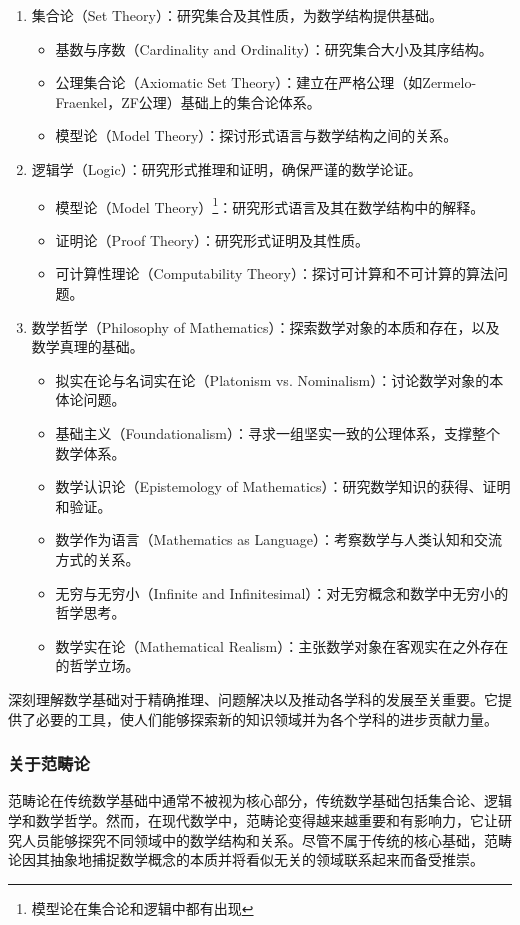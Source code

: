 \begin{enumerate}
  \item 集合论（Set Theory）：研究集合及其性质，为数学结构提供基础。
    \begin{itemize}
      \item 基数与序数（Cardinality and Ordinality）：研究集合大小及其序结构。
      \item 公理集合论（Axiomatic Set Theory）：建立在严格公理（如Zermelo-Fraenkel，ZF公理）基础上的集合论体系。
      \item 模型论（Model Theory）：探讨形式语言与数学结构之间的关系。
    \end{itemize}
    
  \item 逻辑学（Logic）：研究形式推理和证明，确保严谨的数学论证。
    \begin{itemize}
      \item 模型论（Model Theory）\footnote{模型论在集合论和逻辑中都有出现}：研究形式语言及其在数学结构中的解释。
      \item 证明论（Proof Theory）：研究形式证明及其性质。
      \item 可计算性理论（Computability Theory）：探讨可计算和不可计算的算法问题。
    \end{itemize}
    
  \item 数学哲学（Philosophy of Mathematics）：探索数学对象的本质和存在，以及数学真理的基础。
    \begin{itemize}
      \item 拟实在论与名词实在论（Platonism vs. Nominalism）：讨论数学对象的本体论问题。
      \item 基础主义（Foundationalism）：寻求一组坚实一致的公理体系，支撑整个数学体系。
      \item 数学认识论（Epistemology of Mathematics）：研究数学知识的获得、证明和验证。
      \item 数学作为语言（Mathematics as Language）：考察数学与人类认知和交流方式的关系。
      \item 无穷与无穷小（Infinite and Infinitesimal）：对无穷概念和数学中无穷小的哲学思考。
      \item 数学实在论（Mathematical Realism）：主张数学对象在客观实在之外存在的哲学立场。
    \end{itemize}
\end{enumerate}

深刻理解数学基础对于精确推理、问题解决以及推动各学科的发展至关重要。它提供了必要的工具，使人们能够探索新的知识领域并为各个学科的进步贡献力量。

\subsubsection{关于范畴论}

范畴论在传统数学基础中通常不被视为核心部分，传统数学基础包括集合论、逻辑学和数学哲学。然而，在现代数学中，范畴论变得越来越重要和有影响力，它让研究人员能够探究不同领域中的数学结构和关系。尽管不属于传统的核心基础，范畴论因其抽象地捕捉数学概念的本质并将看似无关的领域联系起来而备受推崇。